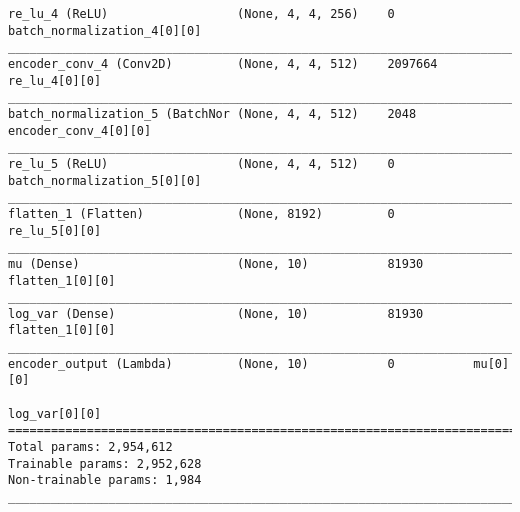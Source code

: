 \begin{lstlisting}[caption={(dSprites, 7,500, 6,250, 5,000, 3,750)-VAE Encoder},captionpos=b,basicstyle=\tiny, label={lst:dsprites-vae-encoder}]
re_lu_4 (ReLU)                  (None, 4, 4, 256)    0           batch_normalization_4[0][0]
__________________________________________________________________________________________________
encoder_conv_4 (Conv2D)         (None, 4, 4, 512)    2097664     re_lu_4[0][0]
__________________________________________________________________________________________________
batch_normalization_5 (BatchNor (None, 4, 4, 512)    2048        encoder_conv_4[0][0]
__________________________________________________________________________________________________
re_lu_5 (ReLU)                  (None, 4, 4, 512)    0           batch_normalization_5[0][0]
__________________________________________________________________________________________________
flatten_1 (Flatten)             (None, 8192)         0           re_lu_5[0][0]
__________________________________________________________________________________________________
mu (Dense)                      (None, 10)           81930       flatten_1[0][0]
__________________________________________________________________________________________________
log_var (Dense)                 (None, 10)           81930       flatten_1[0][0]
__________________________________________________________________________________________________
encoder_output (Lambda)         (None, 10)           0           mu[0][0]
                                                                 log_var[0][0]
==================================================================================================
Total params: 2,954,612
Trainable params: 2,952,628
Non-trainable params: 1,984
__________________________________________________________________________________________________
\end{lstlisting}